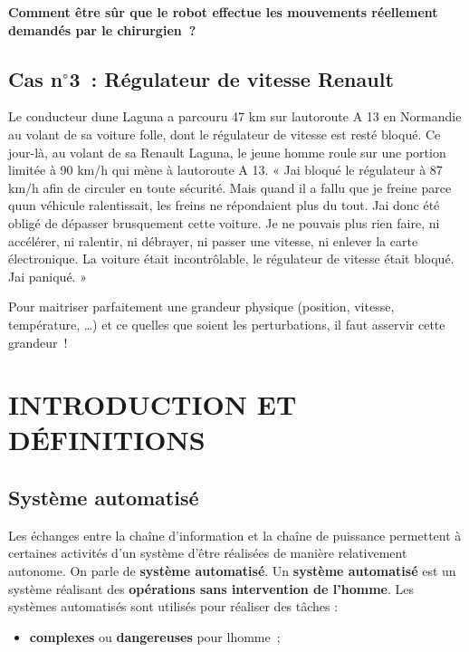 \textbf{Comment être sûr que le robot effectue les mouvements réellement
demandés par le chirurgien~?}

\subsection{Cas n$^\circ$3~: Régulateur de vitesse
Renault}\label{cas-n3-ruxe9gulateur-de-vitesse-renault}

Le
conducteur d\textquotesingle une Laguna a parcouru 47 km sur
l\textquotesingle autoroute A 13 en Normandie au volant de sa voiture
folle, dont le régulateur de vitesse est resté bloqué. Ce jour-là, au
volant de sa Renault Laguna, le jeune homme roule sur une portion
limitée à 90 km/h qui mène à l\textquotesingle autoroute A 13. «
J\textquotesingle ai bloqué le régulateur à 87 km/h afin de circuler en
toute sécurité. Mais quand il a fallu que je freine parce
qu\textquotesingle un véhicule ralentissait, les freins ne répondaient
plus du tout. J\textquotesingle ai donc été obligé de dépasser
brusquement cette voiture. Je ne pouvais plus rien faire, ni accélérer,
ni ralentir, ni débrayer, ni passer une vitesse, ni enlever la carte
électronique. La voiture était incontrôlable, le régulateur de vitesse
était bloqué. J\textquotesingle ai paniqué. »

Pour maitriser parfaitement une grandeur physique (position, vitesse,
température, \ldots) et ce quelles que soient les perturbations, il faut
asservir cette grandeur~!


\section{INTRODUCTION ET DÉFINITIONS}\label{introduction-et-definitions}

\subsection{Système automatisé}\label{systuxe8me-automatisuxe9}

Les échanges entre la chaîne d'information et la chaîne de puissance
permettent à certaines activités d'un système d'être réalisées de
manière relativement autonome. On parle de \textbf{système automatisé}.
Un \textbf{système automatisé} est un système réalisant des
\textbf{opérations sans intervention de l'homme}. Les systèmes
automatisés sont utilisés pour réaliser des tâches :

\begin{itemize}
\item
  \textbf{complexes} ou \textbf{dangereuses} pour
  l\textquotesingle homme~;
\end{itemize}

